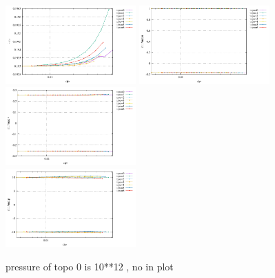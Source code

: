 \begin{center}
\includegraphics[width=5cm]{python_codes/fieldstone_78/results/vrms_exp6.pdf} 
\includegraphics[width=5cm]{python_codes/fieldstone_78/results/stats_u_exp6.pdf}
\includegraphics[width=5cm]{python_codes/fieldstone_78/results/stats_v_exp6.pdf}\\
\includegraphics[width=5cm]{python_codes/fieldstone_78/results/stats_p_exp6.pdf}
\end{center}

pressure of topo 0 is 10**12 , no in plot

